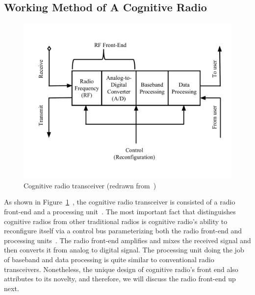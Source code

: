 \subsection{Working Method of A Cognitive Radio}

\begin{figure}[!htbp]
\vspace{-1cm}
\begin{center}
    \includegraphics[scale=0.5]{myFigures/PhysicalCR}
\vspace{-1cm}
    \caption{Cognitive radio transceiver (redrawn from~\cite{jondral2005software})}
    \label{fig:PhysicalCR}
\end{center}
\end{figure}

As shown in Figure~\ref{fig:PhysicalCR}~\cite{jondral2005software}, the cognitive radio transceiver is consisted of a radio front-end and a processing unit~\cite{akyildiz2006next}. The most important fact that distinguishes cognitive radios from other traditional radios is cognitive radio's ability to reconfigure itself via a control bus parameterizing both the radio front-end and processing units~\cite{jondral2005software}. The radio front-end amplifies and mixes the received signal and then converts it from analog to digital signal. The processing unit doing the job of baseband and data processing is quite similar to conventional radio transceivers. Nonetheless, the unique design of cognitive radio's front end also attributes to its novelty, and therefore, we will discuss the radio front-end up next.

